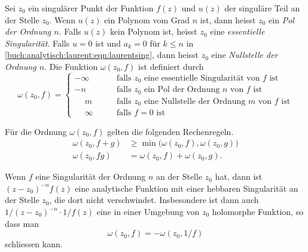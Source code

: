\begin{definition}
Sei $z_0$ ein singulärer Punkt der Funktion $f(z)$ und $u(z)$ der 
singuläre Teil an der Stelle $z_0$.
Wenn $u(z)$ ein Polynom vom Grad $n$ ist, dann heisst $z_0$ ein
\emph{Pol der Ordnung $n$}.
%
%
Falls $u(z)$ kein Polynom ist, heisst $z_0$ eine \emph{essentielle
Singularität}.
%
Falls $u=0$ ist und $a_k=0$ für $k\le n$ in 
\eqref{buch:analytisch:laurent:eqn:laurentsing},
dann heisst $z_0$ eine \emph{Nullstelle der Ordnung $n$}.
%
Die Funktion $\omega(z_0,f)$ ist definiert durch
\[
\omega(z_0,f)
=
\begin{cases}
-\infty&\qquad\text{falls $z_0$ eine essentielle Singularität von $f$ ist}\\
-n&\qquad\text{falls $z_0$ ein Pol der Ordnung $n$ von $f$ ist}\\
\phantom{-}m&\qquad\text{falls $z_0$ eine Nullstelle der Ordnung $m$ von $f$ ist}\\
\phantom{-}\infty&\qquad\text{falls $f=0$ ist}
\end{cases}
\]
\end{definition}

Für die Ordnung $\omega(z_0,f)$ gelten die folgenden Rechenregeln.
\begin{align*}
\omega(z_0,f+g) &\ge \min\bigl(\omega(z_0,f),  \omega(z_0,g)\bigr)
\\
\omega(z_0,fg) &= \omega(z_0,f) + \omega(z_0,g).
\end{align*}

Wenn $f$ eine Singularität der Ordnung $n$ an der Stelle $z_0$ hat, 
dann ist $(z-z_0)^{-n}f(z)$ eine analytische Funktion mit einer
hebbaren Singularität an der Stelle $z_0$, die dort nicht verschwindet.
Insbesondere ist dann auch $1/(z-z_0)^{-n}\cdot 1/f(z)$ eine in einer
Umgebung von $z_0$ holomorphe Funktion, so dass man
\[
\omega(z_0,f)
=
-\omega(z_0,1/f)
\]
schliessen kann.
